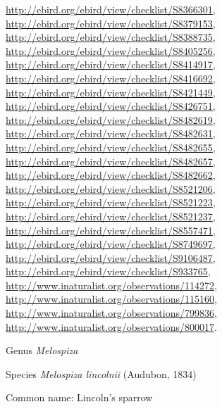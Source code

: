\documentclass[9pt, article]{memoir}
\begin{document}
\begin{multicols}{2}
\url{http://ebird.org/ebird/view/checklist/S8366301}, 
\url{http://ebird.org/ebird/view/checklist/S8379153}, 
\url{http://ebird.org/ebird/view/checklist/S8388735}, 
\url{http://ebird.org/ebird/view/checklist/S8405256}, 
\url{http://ebird.org/ebird/view/checklist/S8414917}, 
\url{http://ebird.org/ebird/view/checklist/S8416692}, 
\url{http://ebird.org/ebird/view/checklist/S8421449}, 
\url{http://ebird.org/ebird/view/checklist/S8426751}, 
\url{http://ebird.org/ebird/view/checklist/S8482619}, 
\url{http://ebird.org/ebird/view/checklist/S8482631}, 
\url{http://ebird.org/ebird/view/checklist/S8482655}, 
\url{http://ebird.org/ebird/view/checklist/S8482657}, 
\url{http://ebird.org/ebird/view/checklist/S8482662}, 
\url{http://ebird.org/ebird/view/checklist/S8521206}, 
\url{http://ebird.org/ebird/view/checklist/S8521223}, 
\url{http://ebird.org/ebird/view/checklist/S8521237}, 
\url{http://ebird.org/ebird/view/checklist/S8557471}, 
\url{http://ebird.org/ebird/view/checklist/S8749697}, 
\url{http://ebird.org/ebird/view/checklist/S9106487}, 
\url{http://ebird.org/ebird/view/checklist/S933765}, 
\url{http://www.inaturalist.org/observations/114272}, 
\url{http://www.inaturalist.org/observations/115160}, 
\url{http://www.inaturalist.org/observations/799836}, 
\url{http://www.inaturalist.org/observations/800017}.

\vspace{6pt}\noindent\hspace{30pt}Genus \textit{Melospiza}


\vspace{6pt}\noindent\hspace{36pt}Species \textit{Melospiza lincolnii} (Audubon, 1834)


Common name: Lincoln's sparrow


\end{multicols}
\end{document}
